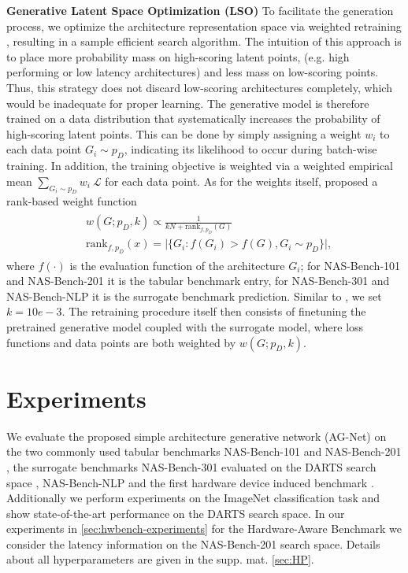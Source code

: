 \documentclass[runningheads]{llncs}
\begin{document}
\noindent \textbf{Generative Latent Space Optimization (LSO)}
To facilitate the generation process, we optimize the architecture representation space via weighted retraining \cite{2020Reweighting}, resulting in a sample efficient search algorithm.
The intuition of this approach is to place more probability mass on high-scoring latent points, (e.g. high performing or low latency architectures) and less mass on low-scoring points.
Thus, this strategy does not discard low-scoring architectures completely, which would be inadequate for proper learning.
The generative model is therefore trained on a data distribution that systematically increases the probability of high-scoring latent points.
This can be done by simply assigning a weight $w_i$ to each data point $G_i \sim p_D$, indicating its likelihood to occur during batch-wise training.
In addition, the training objective is weighted via a weighted empirical mean
$\sum_{G_i \sim p_D} w_i~\mathcal{L}$ for each data point.
As for the weights itself,  \cite{2020Reweighting} proposed a rank-based weight function
\begin{align}\label{eq:weights}
\begin{split}
&w(G;p_D,k) \propto \frac{1}{kN + \textrm{rank}_{f,p_D}(G)}\\
&\textrm{rank}_{f,p_D}(x) = \vert\{G_i : f(G_i) > f(G), G_i \sim p_D\} \vert,
    \end{split}
\end{align}
where $f(\cdot)$ is the evaluation function of the architecture $G_i$; for NAS-Bench-101 \cite{2019NB101} and NAS-Bench-201 \cite{2020NB201} it is the tabular benchmark entry, for NAS-Bench-301 \cite{2020NB301} and NAS-Bench-NLP \cite{2020NBNLP} it is the surrogate benchmark prediction.
Similar to \cite{2020Reweighting}, we set $k = 10e-3$.
The retraining procedure itself then consists of finetuning the pretrained generative model coupled with the surrogate model, where loss functions and data points are both weighted by $w(G;p_D,k)$.



\section{Experiments}\label{sec:Experiments}
We evaluate the proposed simple architecture generative network (AG-Net) on the two commonly used tabular benchmarks NAS-Bench-101 \cite{2019NB101} and NAS-Bench-201 \cite{2020NB201}, the surrogate benchmarks NAS-Bench-301 \cite{2020NB301} evaluated on the DARTS search space \cite{2018DARTS}, NAS-Bench-NLP \cite{2020NBNLP} and the first hardware device induced benchmark \cite{2021HWNNB}. Additionally we perform experiments on the ImageNet \cite{2009ImageNet} classification task and show state-of-the-art performance on the DARTS search space. In our experiments in \autoref{sec:hwbench-experiments} for the Hardware-Aware Benchmark we consider the latency information on the NAS-Bench-201 search space. 
Details about all hyperparameters are given in the supp. mat. \autoref{sec:HP}. 
\end{document}
